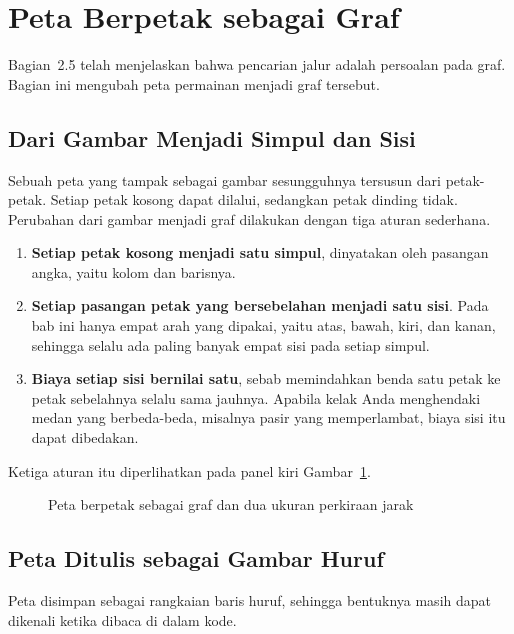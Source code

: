 \section{Peta Berpetak sebagai Graf}
\label{sec:peta-graf}

Bagian~2.5 telah menjelaskan bahwa pencarian jalur adalah persoalan pada graf.
Bagian ini mengubah peta permainan menjadi graf tersebut.

\subsection{Dari Gambar Menjadi Simpul dan Sisi}

Sebuah peta yang tampak sebagai gambar sesungguhnya tersusun dari petak-petak.
Setiap petak kosong dapat dilalui, sedangkan petak dinding tidak. Perubahan
dari gambar menjadi graf dilakukan dengan tiga aturan sederhana.

\begin{enumerate}
  \item \textbf{Setiap petak kosong menjadi satu simpul}, dinyatakan oleh
        pasangan angka, yaitu kolom dan barisnya.
  \item \textbf{Setiap pasangan petak yang bersebelahan menjadi satu sisi}.
        Pada bab ini hanya empat arah yang dipakai, yaitu atas, bawah, kiri,
        dan kanan, sehingga selalu ada paling banyak empat sisi pada setiap
        simpul.
  \item \textbf{Biaya setiap sisi bernilai satu}, sebab memindahkan benda satu
        petak ke petak sebelahnya selalu sama jauhnya. Apabila kelak Anda
        menghendaki medan yang berbeda-beda, misalnya pasir yang memperlambat,
        biaya sisi itu dapat dibedakan.
\end{enumerate}

Ketiga aturan itu diperlihatkan pada panel kiri
Gambar~\ref{fig:peta-heuristik}.

\begin{figure}[htbp]
\centering

\caption{Peta berpetak sebagai graf dan dua ukuran perkiraan jarak}
\label{fig:peta-heuristik}
\end{figure}

\subsection{Peta Ditulis sebagai Gambar Huruf}

Peta disimpan sebagai rangkaian baris huruf, sehingga bentuknya masih dapat
dikenali ketika dibaca di dalam kode.

